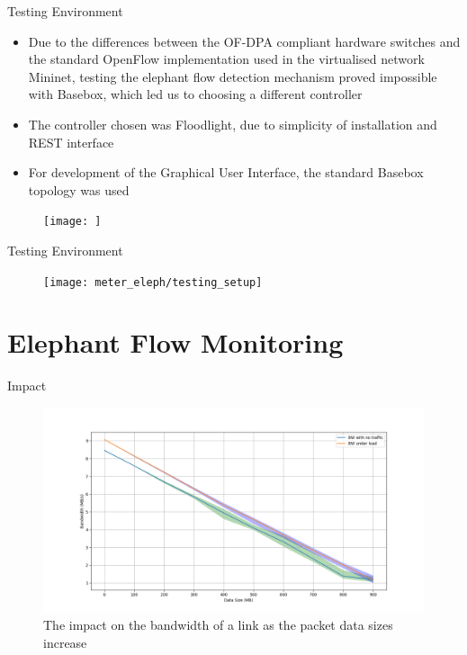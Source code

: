 \documentclass{beamer}
\begin{document}
\begin{frame}{Testing Environment}
    \begin{itemize}
        \item Due to the differences between the OF-DPA compliant hardware switches and the standard OpenFlow implementation used in the virtualised 
            network Mininet, testing the elephant flow detection mechanism proved impossible with Basebox, which led us to choosing a different controller
            \pause 
        \item The controller chosen was Floodlight, due to simplicity of installation and REST interface
        \item For development of the Graphical User Interface, the standard Basebox topology was used
    \end{itemize}
    \begin{figure}
        \texttt{[image: ]}
    \end{figure}
\end{frame}

\begin{frame}{Testing Environment}
    \begin{figure}
        \texttt{[image: meter\_eleph/testing\_setup]}
    \end{figure}
\end{frame}

\section{Elephant Flow Monitoring}

\begin{frame}{Impact}
    \begin{figure}
        \includegraphics[width=1\textwidth]{meter_eleph/bandwidth_loss_per_data_size}
        \caption{The impact on the bandwidth of a link as the packet data sizes increase}
    \end{figure}
\end{frame}
\end{document}
